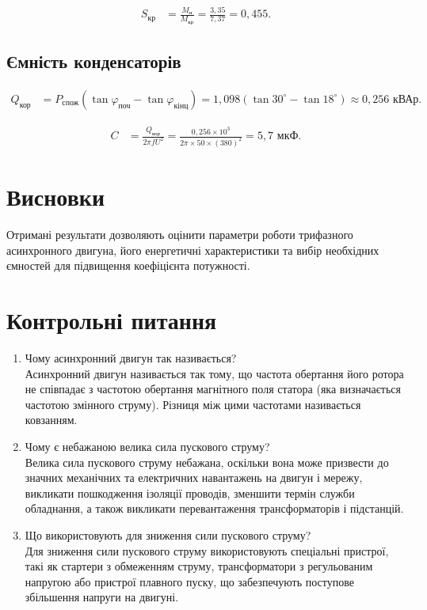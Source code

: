 \documentclass[a4paper]{article}
\begin{document}
\begin{align*}
    S_{\text{кр}} &= \frac{M_{\text{н}}}{M_{\text{кр}}} = \frac{3,35}{7,37} = 0,455.
\end{align*}

\subsection*{Ємність конденсаторів}

\begin{align*}
    Q_{\text{кор}} &= P_{\text{спож}} (\tan \varphi_{\text{поч}} - \tan \varphi_{\text{кінц}}) = 1,098 (\tan 30^\circ - \tan 18^\circ) \approx 0,256 \text{ кВАр}.
\end{align*}

\begin{align*}
    C &= \frac{Q_{\text{кор}}}{2 \pi f U^2} = \frac{0,256 \times 10^3}{2 \pi \times 50 \times (380)^2} = 5,7 \text{ мкФ}.
\end{align*}

\section*{Висновки}

Отримані результати дозволяють оцінити параметри роботи трифазного асинхронного двигуна, його енергетичні характеристики та вибір необхідних ємностей для підвищення коефіцієнта потужності.

\section*{Контрольні питання}
\begin{enumerate}
    \item Чому асинхронний двигун так називається? \\
    Асинхронний двигун називається так тому, що частота обертання його ротора не співпадає з частотою обертання магнітного поля статора (яка визначається частотою змінного струму). Різниця між цими частотами називається ковзанням.
    
    \item Чому є небажаною велика сила пускового струму? \\
    Велика сила пускового струму небажана, оскільки вона може призвести до значних механічних та електричних навантажень на двигун і мережу, викликати пошкодження ізоляції проводів, зменшити термін служби обладнання, а також викликати перевантаження трансформаторів і підстанцій.
    
    \item Що використовують для зниження сили пускового струму? \\
    Для зниження сили пускового струму використовують спеціальні пристрої, такі як стартери з обмеженням струму, трансформатори з регульованим напругою або пристрої плавного пуску, що забезпечують поступове збільшення напруги на двигуні.
\end{enumerate}
\end{document}
